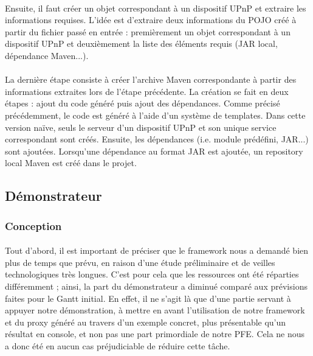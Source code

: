 \documentclass[nocopyrightspace]{sigplanconf}
\begin{document}
			\paragraph{}
			Ensuite, il faut créer un objet correspondant à un dispositif UPnP et extraire les informations requises. L'idée est d'extraire deux informations du POJO créé à partir du fichier passé en entrée : premièrement un objet correspondant à un dispositif UPnP et deuxièmement la liste des éléments requis (JAR local, dépendance Maven...).

			\paragraph{}
			La dernière étape consiste à créer l'archive Maven correspondante à partir des informations extraites lors de l'étape précédente. La création se fait en deux étapes : ajout du code généré puis ajout des dépendances. Comme précisé précédemment, le code est généré à l'aide d'un système de templates. Dans cette version naïve, seuls le serveur d'un dispositif UPnP et son unique service correspondant sont créés. Ensuite, les dépendances (i.e. module prédéfini, JAR...) sont ajoutées. Lorsqu'une dépendance au format JAR est ajoutée, un repository local Maven est créé dans le projet.

	\subsection{Démonstrateur}

		\subsubsection{Conception}

			\paragraph{}
			Tout d’abord, il est important de préciser que le framework nous a demandé bien plus de temps que prévu, en raison d’une étude préliminaire et de veilles technologiques très longues. C’est pour cela que les ressources ont été réparties différemment ; ainsi, la part du démonstrateur a diminué comparé aux prévisions faites pour le Gantt initial. En effet, il ne s’agit là que d’une partie servant à appuyer notre démonstration, à mettre en avant l’utilisation de notre framework et du proxy généré au travers d’un exemple concret, plus présentable qu’un résultat en console, et non pas une part primordiale de notre PFE. Cela ne nous a donc été en aucun cas préjudiciable de réduire cette tâche.
\end{document}
